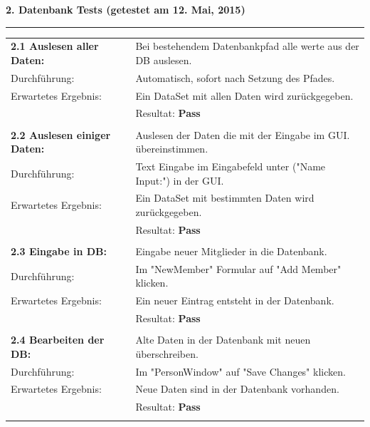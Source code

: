 \documentclass{article}
\begin{document}
\textbf{2. Datenbank Tests (getestet am 12. Mai, 2015)\\}
\rule[2mm]{1\linewidth}{0.3mm}
\begin{tabular}{l|p{12cm}}
	\textbf{2.1 Auslesen aller Daten:} & Bei bestehendem Datenbankpfad alle werte aus der DB auslesen. \\
		Durchführung:			& Automatisch, sofort nach Setzung des Pfades.\\
		Erwartetes Ergebnis: 	& Ein DataSet mit allen Daten wird zurückgegeben. \\
								& Resultat:  \textbf{Pass}\hspace{7.8cm} \color{green} {\ding{51}} \\
								\\
	\textbf{2.2 Auslesen einiger Daten:} & Auslesen der Daten die mit der Eingabe im GUI. übereinstimmen. \\
		Durchführung:			& Text Eingabe im Eingabefeld unter ("Name Input:") in der GUI.\\
		Erwartetes Ergebnis: 	& Ein DataSet mit bestimmten Daten wird zurückgegeben. \\
								& Resultat:  \textbf{Pass}\hspace{7.8cm} \color{green} {\ding{51}} \\
								\\	
	\textbf{2.3 Eingabe in DB:} & Eingabe neuer Mitglieder in die Datenbank. \\
		Durchführung:			& Im "NewMember" Formular auf "Add Member" klicken.\\
		Erwartetes Ergebnis: 	& Ein neuer Eintrag entsteht in der Datenbank. \\
								& Resultat:  \textbf{Pass}\hspace{7.8cm} \color{green} {\ding{51}} \\
								\\	
		\textbf{2.4 Bearbeiten der DB:} & Alte Daten in der Datenbank mit neuen überschreiben. \\
		Durchführung:			& Im "PersonWindow" auf "Save Changes" klicken.\\
		Erwartetes Ergebnis: 	& Neue Daten sind in der Datenbank vorhanden. \\
								& Resultat:  \textbf{Pass}\hspace{7.8cm} \color{green} {\ding{51}} \\
								\\

\end{tabular}
\end{document}
